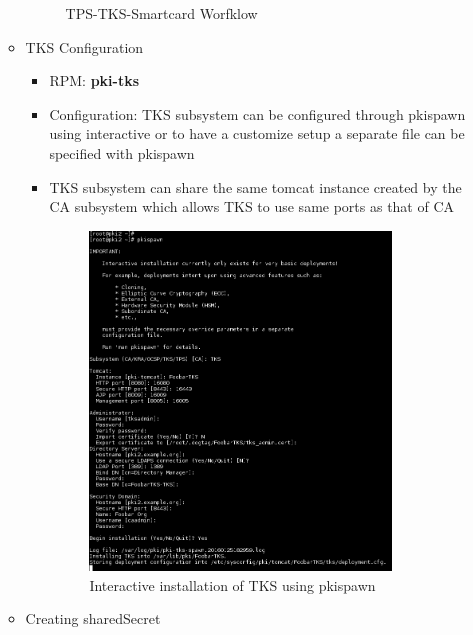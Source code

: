 \documentclass[a4paper]{article}
\begin{document}
\begin{itemize}
\begin{itemize}
\begin{figure}[H]
                            \caption{TPS-TKS-Smartcard Worfklow}
                        \end{figure}
                    \item TKS Configuration 
                        \begin{itemize}
                            \item RPM: \textbf{pki-tks}
                            \item Configuration: TKS subsystem can be configured through pkispawn using interactive or to have a 
                                customize setup a separate file can be specified with pkispawn
                            \item TKS subsystem can share the same tomcat instance created by the CA subsystem which allows 
                                TKS to use same ports as that of CA
                            \begin{figure}[H]
                                \centering
                                \includegraphics[width=80mm]{pkispawn-tks.png}
                                \caption{Interactive installation of TKS using pkispawn}
                            \end{figure}
                        \end{itemize}
                    \item Creating sharedSecret 
                \end{itemize}
    \end{itemize}

\end{document}
